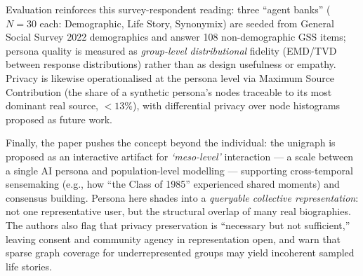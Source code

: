 Evaluation reinforces this survey-respondent reading: three ``agent banks''
($N=30$ each: Demographic, Life Story, Synonymix) are seeded from General
Social Survey 2022 demographics and answer 108 non-demographic GSS items;
persona quality is measured as \emph{group-level distributional} fidelity
(EMD/TVD between response distributions) rather than as design usefulness or
empathy. Privacy is likewise operationalised at the persona level via Maximum
Source Contribution (the share of a synthetic persona's nodes traceable to its
most dominant real source, $<13\%$), with differential privacy over node
histograms proposed as future work.

Finally, the paper pushes the concept beyond the individual: the unigraph is
proposed as an interactive artifact for \emph{`meso-level'} interaction --- a
scale between a single AI persona and population-level modelling --- supporting
cross-temporal sensemaking (e.g., how ``the Class of 1985'' experienced shared
moments) and consensus building. Persona here shades into a \emph{queryable
collective representation}: not one representative user, but the structural
overlap of many real biographies. The authors also flag that privacy
preservation is ``necessary but not sufficient,'' leaving consent and community
agency in representation open, and warn that sparse graph coverage for
underrepresented groups may yield incoherent sampled life stories.


